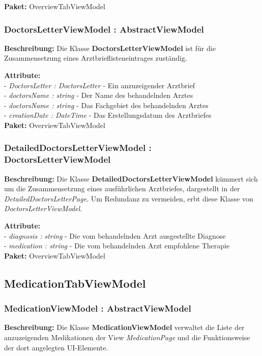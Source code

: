 \documentclass[a4paper]{scrreprt}
\begin{document}
\textbf{Paket:} OverviewTabViewModel

\subsubsection{DoctorsLetterViewModel : AbstractViewModel}
\textbf{Beschreibung:} Die Klasse \textbf{DoctorsLetterViewModel} ist für die Zusammensetzung eines Arztbrieflisteneintrages zuständig.

\textbf{Attribute:}\\
- \textit{DoctorsLetter : DoctorsLetter} - Ein anzuzeigender Arztbrief\\
- \textit{doctorsName : string} - Der Name des behandelnden Arztes\\
- \textit{doctorsName : string} - Das Fachgebiet des behandelnden Arztes\\
- \textit{creationDate : DateTime} - Das Erstellungsdatum des Arztbriefes\\

\textbf{Paket:} OverviewTabViewModel

\subsubsection{DetailedDoctorsLetterViewModel : DoctorsLetterViewModel}
\textbf{Beschreibung:} Die Klasse \textbf{DetailedDoctorsLetterViewModel} kümmert sich um die Zusammensetzung eines ausführlichen Arztbriefes, dargestellt in der \textit{DetailedDoctorsLetterPage}. Um Redundanz zu vermeiden, erbt diese Klasse von \textit{DoctorsLetterViewModel}.

\textbf{Attribute:}\\
- \textit{diagnosis : string} - Die vom behandelnden Arzt ausgestellte Diagnose\\
- \textit{medication : string} - Die vom behandelnden Arzt empfohlene Therapie\\

\textbf{Paket:} OverviewTabViewModel

\subsection{MedicationTabViewModel}
\subsubsection{MedicationViewModel : AbstractViewModel}
\textbf{Beschreibung:} Die Klasse \textbf{MedicationViewModel} verwaltet die Liste der anzuzeigenden Medikationen der View \textit{MedicationPage} und die Funktionsweise der dort angelegten UI-Elemente.
\end{document}
